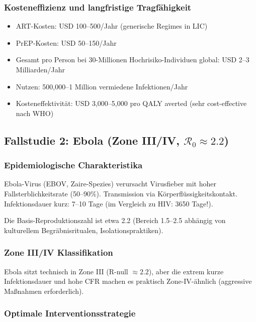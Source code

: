 ﻿\documentclass[a4paper,12pt,twoside]{article}
\theoremstyle{definition}
\begin{document}
\subsubsection{Kosteneffizienz und langfristige Tragfähigkeit}

\begin{itemize}
\item ART-Kosten: USD 100--500/Jahr (generische Regimes in LIC)
\item PrEP-Kosten: USD 50--150/Jahr
\item Gesamt pro Person bei 30-Millionen Hochrisiko-Individuen global: USD 2--3 Milliarden/Jahr
\item Nutzen: 500,000--1 Million vermiedene Infektionen/Jahr
\item Kosteneffektivität: USD 3,000--5,000 pro QALY averted (sehr cost-effective nach WHO)
\end{itemize}

\subsection{Fallstudie 2: Ebola (Zone III/IV, $\mathcal{R}_0 \approx 2.2$)}

\subsubsection{Epidemiologische Charakteristika}

Ebola-Virus (EBOV, Zaire-Spezies) verursacht Virusfieber mit hoher Fallsterblichkeitsrate (50--90\%). Transmission via Körperflüssigkeitskontakt. Infektionsdauer kurz: 7--10 Tage (im Vergleich zu HIV: 3650 Tage!).

Die Basis-Reproduktionszahl ist etwa 2.2 (Bereich 1.5--2.5 abhängig von kulturellem Begräbnisritualen, Isolationspraktiken).

\subsubsection{Zone III/IV Klassifikation}

Ebola sitzt technisch in Zone III (R-null $\approx 2.2$), aber die extrem kurze Infektionsdauer und hohe CFR machen es praktisch Zone-IV-ähnlich (aggressive Maßnahmen erforderlich).

\subsubsection{Optimale Interventionsstrategie}
\end{document}
